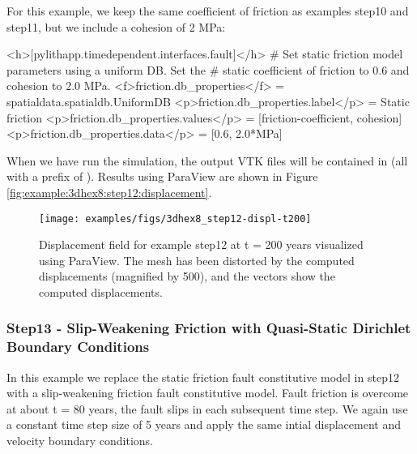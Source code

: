 For this example, we keep the same coefficient of friction as examples
step10 and step11, but we include a cohesion of 2 MPa:
\begin{cfg}
<h>[pylithapp.timedependent.interfaces.fault]</h>
# Set static friction model parameters using a uniform DB. Set the
# static coefficient of friction to 0.6 and cohesion to 2.0 MPa.
<f>friction.db_properties</f> = spatialdata.spatialdb.UniformDB
<p>friction.db_properties.label</p> = Static friction
<p>friction.db_properties.values</p> = [friction-coefficient, cohesion]
<p>friction.db_properties.data</p> = [0.6, 2.0*MPa]
\end{cfg}
When we have run the simulation, the output VTK files will be contained
in  (all with a prefix of ).
Results using ParaView are shown in Figure \vref{fig:example:3dhex8:step12:displacement}.

\begin{figure}
  \texttt{[image: examples/figs/3dhex8\_step12-displ-t200]}
  \caption{Displacement field for example step12 at t = 200 years visualized
    using ParaView. The mesh has been distorted by the computed displacements
    (magnified by 500), and the vectors show the computed displacements.}
  \label{fig:example:3dhex8:step12:displacement}
\end{figure}


\subsubsection{Step13 - Slip-Weakening Friction with Quasi-Static Dirichlet Boundary Conditions}

In this example we replace the static friction fault constitutive
model in step12 with a slip-weakening friction fault constitutive
model. Fault friction is overcome at about t = 80 years, the fault
slips in each subsequent time step. We again use a constant time step
size of 5 years and apply the same intial displacement and velocity
boundary conditions.

